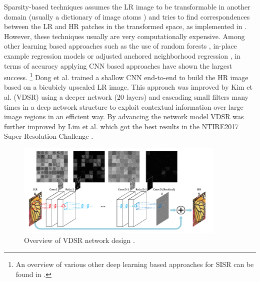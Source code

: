 Sparsity-based techniques assumes the \ac{LR} image to be transformable in another
domain (usually a dictionary of image atoms \cite{SARPFTTAISAIP}) and tries to
find correspondences between the \ac{LR} and \ac{HR} patches in the transformed space, as
implemented in \cite{IDASRBASDSAAR}. However, these techniques usually are
very computationally expensive. Among other learning based approaches such as
the use of random forests \cite{FAAIUWSRF}, in-place example regression models
\cite{FISRBOIPER} or adjusted anchored neighborhood regression \cite{AANRFFSR},
in terms of accuracy applying CNN based approaches have shown the largest success.
\footnote{An overview of various other deep learning based approaches for SISR
can be found in \cite{DLFSISRABR}.}
Dong et al. \cite{LADCNFISR} trained a shallow CNN end-to-end to build the HR
image based on a bicubicly upscaled LR image. This approach was improved by Kim
et al. \cite{AISRUVDCN} (VDSR) using a deeper network (20 layers) and cascading
small filters many times in a deep network structure to exploit contextual
information over large image regions in an efficient way. By advancing the
network model VDSR was further improved by Lim et al. \cite{EDRNFSISR} which
got the best results in the NTIRE2017 Super-Resolution Challenge \cite{NTIRE2017}.

\begin{figure}[!htbp]
	\centering
	\includegraphics[width=10cm]{figures/vdsr}
	\caption{Overview of VDSR network design \cite{AISRUVDCN}.}
  \label{fig:vdsr}
\end{figure}

